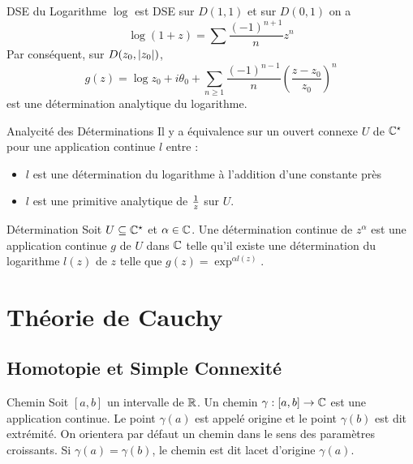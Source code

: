 \documentclass{cours}
\begin{document}
\begin{propositionfr}{DSE du Logarithme}{}
    $\log$ est DSE sur $D(1, 1)$ et sur $D(0, 1)$ on a
    \[
        \log(1 + z) = \sum \frac{(-1)^{n + 1}}{n}z^{n}
    \]
    Par conséquent, sur $D(z_{0}, \left|z_{0}\right|)$, 
    \[
        g(z) = \log z_{0} + i\theta_{0} + \sum_{n \geq 1}\frac{(-1)^{n - 1}}{n}\left(\frac{z - z_{0}}{z_{0}}\right)^{n}
    \]
    est une détermination analytique du logarithme. 
\end{propositionfr}
\begin{propositionfr}{Analycité des Déterminations}{}
    Il y a équivalence sur un ouvert connexe $U$ de $\mathbb{C}^{\star}$ pour une application continue $l$ entre : 
    \begin{itemize}
        \item $l$ est une détermination du logarithme à l'addition d'une constante près
        \item $l$ est une primitive analytique de $1\over z$ sur $U$. 
    \end{itemize}
\end{propositionfr}

\begin{définition}{Détermination}{}
    Soit $U \subseteq \mathbb{C}^{\star}$ et $\alpha \in \mathbb{C}$. Une détermination continue de $z^{\alpha}$ est une application continue $g$ de $U$ dans $\mathbb{C}$ telle qu'il existe une détermination du logarithme $l(z)$ de $z$ telle que $g(z) = \exp^{\alpha l(z)}$.
\end{définition}

\section{Théorie de Cauchy}
\subsection{Homotopie et Simple Connexité}
\begin{définition}{Chemin}{}
    Soit $\left[a, b\right]$ un intervalle de $\mathbb{R}$. Un chemin $\gamma: \left[a, b\right] \to \mathbb{C}$ est une application continue. Le point $\gamma(a)$ est appelé origine et le point $\gamma(b)$ est dit extrémité. On orientera par défaut un chemin dans le sens des paramètres croissants. Si $\gamma(a) = \gamma(b)$, le chemin est dit lacet d'origine $\gamma(a)$.
\end{définition}
\end{document}
